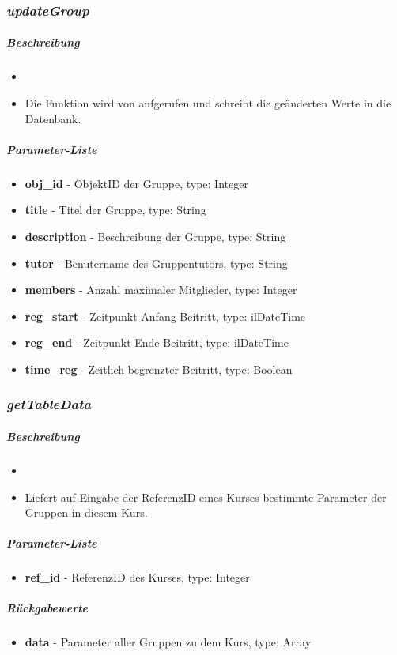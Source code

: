 \subsubsection*{\textit{updateGroup}}\label{updateGroupGDGUI}
\subparagraph{Beschreibung}
\begin{itemize}
	\item[]  \noindent{} 
	\item[] Die Funktion wird von  aufgerufen und schreibt die geänderten Werte in die Datenbank.
\end{itemize}
\subparagraph{Parameter-Liste}
\begin{itemize}
	\item[] \textbf{obj\_id} - ObjektID der Gruppe, type: Integer
	\item[] \textbf{title} - Titel der Gruppe, type: String
	\item[] \textbf{description} - Beschreibung der Gruppe, type: String
	\item[] \textbf{tutor} - Benutername des Gruppentutors, type: String
	\item[] \textbf{members} - Anzahl maximaler Mitglieder, type: Integer
	\item[] \textbf{reg\_start} - Zeitpunkt Anfang Beitritt, type: ilDateTime
	\item[] \textbf{reg\_end} - Zeitpunkt Ende Beitritt, type: ilDateTime
	\item[] \textbf{time\_reg} - Zeitlich begrenzter Beitritt, type: Boolean
\end{itemize}

\subsubsection*{\textit{getTableData}}\label{getTableDataGDGUI}
\subparagraph{Beschreibung}
\begin{itemize}
	\item[] \noindent{}
	\item[] Liefert auf Eingabe der ReferenzID eines Kurses bestimmte Parameter der Gruppen in diesem Kurs.
\end{itemize}
\subparagraph{Parameter-Liste}
\begin{itemize}
	\item[] \textbf{ref\_id} - ReferenzID des Kurses, type: Integer
\end{itemize}
\subparagraph{Rückgabewerte}
\begin{itemize}
	\item[] \textbf{data} - Parameter aller Gruppen zu dem Kurs, type: Array
\end{itemize}

